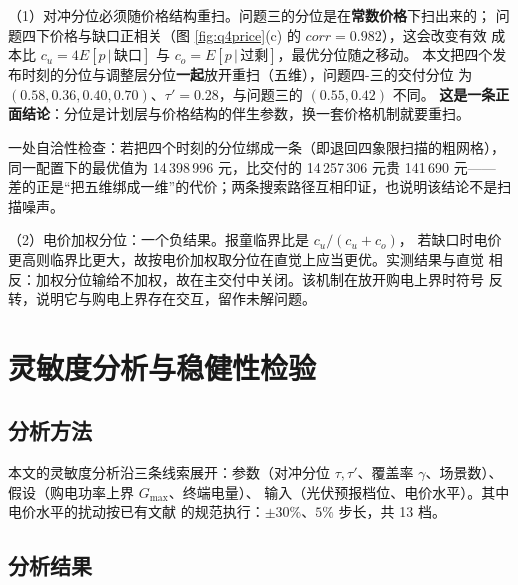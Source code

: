 \documentclass[withoutpreface]{cumcmthesis}
\renewcommand{\emph}[1]{\textbf{#1}}
\begin{document}
\noindent（1）对冲分位必须随价格结构重扫。问题三的分位是在\emph{常数价格}下扫出来的；
问题四下价格与缺口正相关（图 \ref{fig:q4price}(c) 的 $corr=0.982$），这会改变有效
成本比 $c_u=4E[p\,|\,\text{缺口}]$ 与 $c_o=E[p\,|\,\text{过剩}]$，最优分位随之移动。
本文把四个发布时刻的分位与调整层分位\emph{一起}放开重扫（五维），问题四-三的交付分位
为 $(0.58,0.36,0.40,0.70)$、$\tau'=0.28$，与问题三的 $(0.55,0.42)$ 不同。
\textbf{这是一条正面结论}：分位是计划层与价格结构的伴生参数，换一套价格机制就要重扫。

\noindent 一处自洽性检查：若把四个时刻的分位绑成一条（即退回四象限扫描的粗网格），
同一配置下的最优值为 14\,398\,996 元，比交付的 14\,257\,306 元贵 141\,690 元——
差的正是“把五维绑成一维”的代价；两条搜索路径互相印证，也说明该结论不是扫描噪声。

\noindent（2）电价加权分位：一个负结果。报童临界比是 $c_u/(c_u+c_o)$，
若缺口时电价更高则临界比更大，故按电价加权取分位在直觉上应当更优。实测结果与直觉
相反：加权分位输给不加权，故在主交付中关闭。该机制在放开购电上界时符号
反转，说明它与购电上界存在交互，留作未解问题。


\section{灵敏度分析与稳健性检验}
\label{sec:sens}

\subsection{分析方法}

本文的灵敏度分析沿三条线索展开：参数（对冲分位 $\tau,\tau'$、覆盖率
$\gamma$、场景数）、假设（购电功率上界 $G_{\max}$、终端电量）、
输入（光伏预报档位、电价水平）。其中电价水平的扰动按已有文献
\cite{parra2016} 的规范执行：$\pm30\%$、$5\%$ 步长，共 13 档。

\subsection{分析结果}
\end{document}
